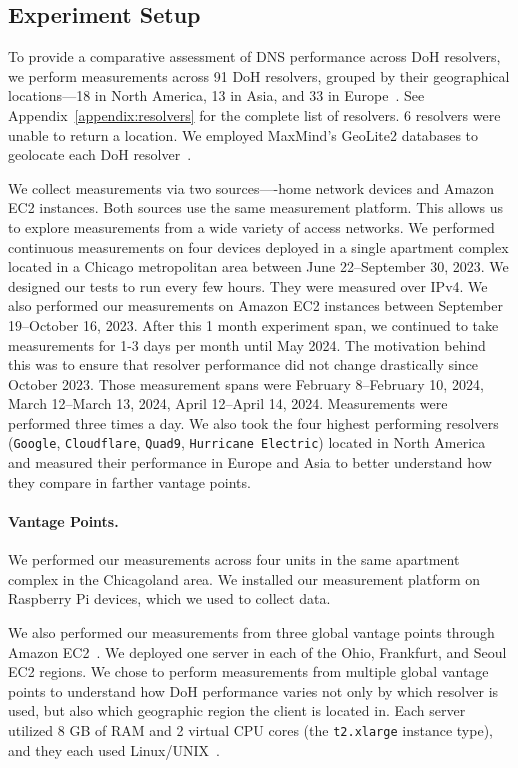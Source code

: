 \subsection{Experiment Setup}
To provide a comparative assessment of DNS
performance across DoH resolvers, we perform measurements across 91 DoH
resolvers, grouped by their geographical locations—18 in North America, 13 in
Asia, and 33 in Europe~\cite{dnscrypt}. See Appendix~\ref{appendix:resolvers} for the complete list of resolvers. 6 resolvers were unable to return a location. 
We employed MaxMind's GeoLite2 databases to geolocate each DoH resolver~\cite{maxmind}.

We collect measurements via two sources—-home network devices and Amazon EC2 instances. 
Both sources use the same measurement platform. This allows us to explore measurements from a wide variety
of access networks. We performed continuous measurements on four devices deployed in a single apartment complex located in a 
Chicago metropolitan area between June 22--September 30, 2023. We designed our tests to run every few hours. They were measured over IPv4. We also performed our measurements on Amazon EC2 instances between September 19--October 16, 2023. 
After this 1 month experiment span, we continued to take measurements for 1-3 days per month until May 2024. 
The motivation behind this was to ensure that resolver performance did not change drastically since October 2023. 
Those measurement spans were February 8--February 10, 2024, 
March 12--March 13, 2024, April 12--April 14, 2024. Measurements were performed three times a day. 
We also took the four highest performing resolvers (\texttt{Google}, \texttt{Cloudflare}, \texttt{Quad9},
\texttt{Hurricane Electric}) located in North America and measured their
performance in Europe and Asia to better understand how they compare in
farther vantage points. 

\paragraph{Vantage Points.} 
We performed our measurements across four units in the same apartment complex in the Chicagoland area. 
We installed our measurement platform on Raspberry Pi devices, which we used to 
collect data. 

We also performed our measurements from three global
vantage points through Amazon EC2~\cite{amazon_ec2}.  We deployed one server
in each of the Ohio, Frankfurt, and Seoul EC2 regions.  We chose to perform
measurements from multiple global vantage points to understand how DoH
performance varies not only by which resolver is used, but also which
geographic region the client is located in.  Each server utilized 8 GB of RAM
and 2 virtual CPU cores (the \texttt{t2.xlarge} instance type), and they each
used Linux/UNIX~\cite{amazon_ec2_instance_types}.


